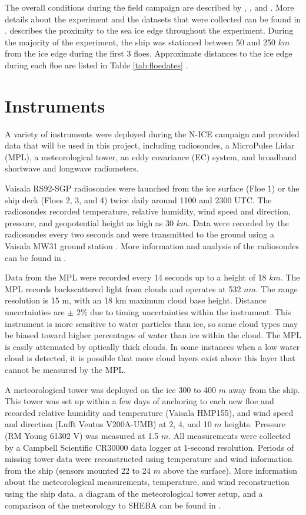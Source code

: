  The overall conditions during the field campaign are described by \citet{cohen:2017}, \citet{kayser:2017}, and \citet{walden:2017}. More details about the experiment and the datasets that were collected can be found in \citet{granskog:2015}. \citet{itkin:2017} describes the proximity to the sea ice edge throughout the experiment. During the majority of the experiment, the ship was stationed between 50 and 250 $km$ from the ice edge during the first 3 floes. Approximate distances to the ice edge during each floe are listed in Table \ref{tab:floedates} \citep{oikkonen:2017}.

\section{Instruments}
A variety of instruments were deployed during the N-ICE campaign and provided data that will be used in this project, including radiosondes, a MicroPulse Lidar (MPL), a meteorological tower, an eddy covariance (EC) system, and broadband shortwave and longwave radiometers. 

Vaisala RS92-SGP radiosondes were launched from the ice surface (Floe 1) or the ship deck (Floes 2, 3, and 4) twice daily around 1100 and 2300 UTC. The radiosondes recorded temperature, relative humidity, wind speed and direction, pressure, and geopotential height as high as 30 $km$. Data were recorded by the radiosondes every two seconds and were transmitted to the ground using a Vaisala MW31 ground station \citep{kayser:2017, cohen:2017}. More information and analysis of the radiosondes can be found in \citet{kayser:2017}.

Data from the MPL were recorded every 14 seconds up to a height of 18 $km$. The MPL records backscattered light from clouds and operates at 532 $nm$. The range resolution is 15 m, with an 18 km maximum cloud base height. Distance uncertainties are $\pm$ 2$\%$ due to timing uncertainties within the instrument. This instrument is more sensitive to water particles than ice, so some cloud types may be biased toward higher percentages of water than ice within the cloud. The MPL is easily attenuated by optically thick clouds. In some instances when a low water cloud is detected, it is possible that more cloud layers exist above this layer that cannot be measured by the MPL. 

A meteorological tower was deployed on the ice 300 to 400 $m$ away from the ship. This tower was set up within a few days of anchoring to each new floe and recorded relative humidity and temperature (Vaisala HMP155), and wind speed and direction (Lufft Ventus V200A-UMB) at 2, 4, and 10 $m$ heights. Pressure (RM Young 61302 V) was measured at 1.5 $m$. All measurements were collected by a Campbell Scientific CR30000 data logger at 1-second resolution. Periods of missing tower data were reconstructed using temperature and wind information from the ship (sensors mounted 22 to 24 $m$ above the surface). More information about the meteorological measurements, temperature, and wind reconstruction using the ship data, a diagram of the meteorological tower setup, and a comparison of the meteorology to SHEBA can be found in \citet{cohen:2017}.

